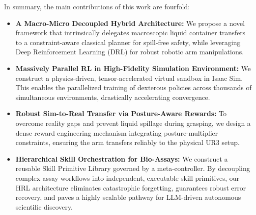 \documentclass[journal,twocolumn]{IEEEtran}
\begin{document}
In summary, the main contributions of this work are fourfold:
\begin{itemize}
    \item \textbf{A Macro-Micro Decoupled Hybrid Architecture:} We propose a novel framework that intrinsically delegates macroscopic liquid container transfers to a constraint-aware classical planner for spill-free safety, while leveraging Deep Reinforcement Learning (DRL) for robust robotic arm manipulations.
    \item \textbf{Massively Parallel RL in High-Fidelity Simulation Environment:} We construct a physics-driven, tensor-accelerated virtual sandbox in Isaac Sim. This enables the parallelized training of dexterous policies across thousands of simultaneous environments, drastically accelerating convergence.
    \item \textbf{Robust Sim-to-Real Transfer via Posture-Aware Rewards:} To overcome reality gaps and prevent liquid spillage during grasping, we design a dense reward engineering mechanism integrating posture-multiplier constraints, ensuring the arm transfers reliably to the physical UR3 setup.
    \item \textbf{Hierarchical Skill Orchestration for Bio-Assays:} We construct a reusable Skill Primitive Library governed by a meta-controller. By decoupling complex assay workflows into independent, executable skill primitives, our HRL architecture eliminates catastrophic forgetting, guarantees robust error recovery, and paves a highly scalable pathway for LLM-driven autonomous scientific discovery.
\end{itemize}
\end{document}
